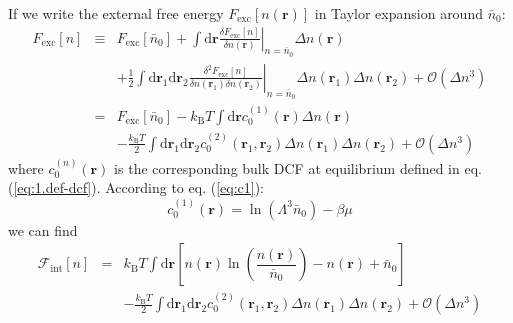 If we write the external free energy $F_{\mathrm{exc}}\left[n(\mathbf{r})\right]$
in Taylor expansion around $\bar{n}_{0}$:
\begin{eqnarray}
F_{\mathrm{exc}}\left[n\right] & \equiv & F_{\mathrm{exc}}\left[\bar{n}_{0}\right]+\int\mathrm{d}\mathbf{r}\left.\frac{\delta F_{\mathrm{exc}}\left[n\right]}{\delta n(\mathbf{r})}\right|_{n=\bar{n}_{0}}\Delta n(\mathbf{r})\nonumber \\
 &  & +\frac{1}{2}\int\mathrm{d}\mathbf{\mathbf{r}}_{1}\mathrm{d}\mathbf{r}_{2}\left.\frac{\delta^{2}F_{\mathrm{exc}}\left[n\right]}{\delta n(\mathbf{r}_{1})\delta n(\mathbf{r}_{2})}\right|_{n=\bar{n}_{0}}\Delta n(\mathbf{r}_{1})\Delta n(\mathbf{r}_{2})+\mathcal{O}(\Delta n^{3})\nonumber \\
 & = & F_{\mathrm{exc}}\left[\bar{n}_{0}\right]-k_{\mathrm{B}}T\int\mathrm{d}\mathbf{r}c_{0}^{(1)}(\mathbf{r})\Delta n(\mathbf{r})\nonumber \\
 &  & -\frac{k_{\mathrm{B}}T}{2}\int\mathrm{d}\mathbf{\mathbf{r}}_{1}\mathrm{d}\mathbf{r}_{2}c_{0}^{(2)}(\mathbf{r}_{1},\mathbf{r}_{2})\Delta n(\mathbf{r}_{1})\Delta n(\mathbf{r}_{2})+\mathcal{O}(\Delta n{}^{3})\label{eq:taylor-fexc}
\end{eqnarray}
where $c_{0}^{(n)}(\mathbf{r})$ is the corresponding bulk \acs{DCF}
at equilibrium defined in eq. (\ref{eq:1.def-dcf}). According to
eq. (\ref{eq:c1}):
\begin{equation}
c_{0}^{(1)}(\mathbf{r})=\ln\left(\Lambda^{3}\bar{n}_{0}\right)-\beta\mu
\end{equation}
we can find
\begin{eqnarray}
\mathcal{F}_{\mathrm{int}}[n] & = & k_{\mathrm{B}}T\int\mathrm{d}\mathbf{r}\left[n(\mathbf{r})\ln\left(\dfrac{n(\mathbf{r})}{\bar{n}_{0}}\right)-n(\mathbf{r})+\bar{n}_{0}\right]\\
 &  & -\frac{k_{\mathrm{B}}T}{2}\int\mathrm{d}\mathbf{\mathbf{r}}_{1}\mathrm{d}\mathbf{r}_{2}c_{0}^{(2)}(\mathbf{r}_{1},\mathbf{r}_{2})\Delta n(\mathbf{r}_{1})\Delta n(\mathbf{r}_{2})+\mathcal{O}(\Delta n{}^{3})\nonumber 
\end{eqnarray}

